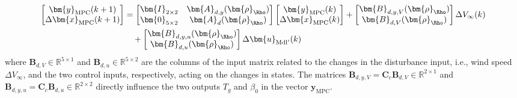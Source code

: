 \begin{equation*}
    \begin{aligned}
        \begin{bmatrix}
            \bm{y}_{\text{MPC}}(k+1) \\
            \Delta \bm{x}_{\text{MPC}}(k+1)
        \end{bmatrix} &= \begin{bmatrix}
            \bm{I}_{2\times2} & \bm{A}_{d,y}(\bm{\rho}_\Rho) \\
            \bm{0}_{5\times2} & \bm{A}_d(\bm{\rho}_\Rho)
        \end{bmatrix}
        \begin{bmatrix}
            \bm{y}_{\text{MPC}}(k) \\
            \Delta \bm{x}_{\text{MPC}}(k)
        \end{bmatrix}
        +
        \begin{bmatrix}
            \bm{B}_{d,y,V}(\bm{\rho}_\Rho) \\
            \bm{B}_{d,V}(\bm{\rho}_\Rho)
        \end{bmatrix} \Delta V_{\infty}(k) \\
        &\quad +
        \begin{bmatrix}
            \bm{B}_{d,y,u}(\bm{\rho}_\Rho) \\
            \bm{B}_{d,u}(\bm{\rho}_\Rho)
        \end{bmatrix} \Delta \bm{u}_{\text{Mdl}^\prime}(k)
    \end{aligned}
\end{equation*}
where $\bm{B}_{d,V} \in \mathbb{R}^{5 \times 1}$ and $\bm{B}_{d,u} \in \mathbb{R}^{5 \times 2}$ are the columns of the input matrix related to the changes in the disturbance input, i.e., wind speed $\Delta V_{\infty}$, and the two control inputs, respectively, acting on the changes in states. The matrices $\bm{B}_{d,y,V} = \bm{C}_c\bm{B}_{d,V} \in \mathbb{R}^{2 \times 1}$ and $\bm{B}_{d,y,u} = \bm{C}_c\bm{B}_{d,u} \in \mathbb{R}^{2 \times 2}$ directly influence the two outputs $T_g$ and $\beta_0$ in the vector $\bm{y}_{\text{MPC}}$. 

